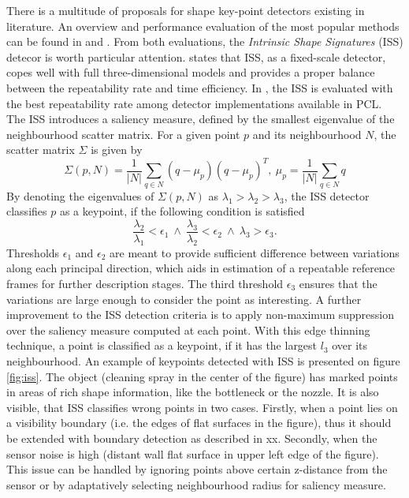 There is a multitude of proposals for shape key-point detectors existing in literature. An overview and performance evaluation of the most popular methods can be found in \cite{keypoints1} and \cite{keypoints2}. From both evaluations, the \textit{Intrinsic Shape Signatures} (ISS) \cite{ISS} detecor is worth particular attention. \cite{keypoints1} states that ISS, as a fixed-scale detector, copes well with full three-dimensional models and provides a proper balance between the repeatability rate and time efficiency. In \cite{keypoints2}, the ISS is evaluated with the best repeatability rate among detector implementations available in PCL. The ISS introduces a saliency measure, defined by the smallest eigenvalue of the neighbourhood scatter matrix. For a given point $p$ and its neighbourhood $N$, the scatter matrix $\Sigma$ is given by
\begin{equation}
\label{eq:scatter}
\Sigma(p,N) = \frac{1}{|N|} \sum\limits_{q\in N}(q -\mu_p)(q - \mu_p)^T,\ \mu_p = \frac{1}{|N|}\sum\limits_{q\in N}q
\end{equation}
By denoting the eigenvalues of $\Sigma(p, N)$ as $\lambda_1 > \lambda_2 > \lambda_3$, the ISS detector classifies $p$ as a keypoint, if the following condition is satisfied
\begin{equation}
\label{iss}
\frac{\lambda_2}{\lambda_1} < \epsilon_1 \  \land \  \frac{\lambda_3}{\lambda_2} < \epsilon_2 \ \land \  \lambda_3 > \epsilon_3.
\end{equation} 
Thresholds $\epsilon_1$ and $\epsilon_2$ are meant to provide sufficient difference between variations along each principal direction, which aids in estimation of a repeatable reference frames for further description stages. The third threshold $\epsilon_3$ ensures that the variations are large enough to consider the point as interesting. A further improvement to the ISS detection criteria is to apply non-maximum suppression over the saliency measure computed at each point. With this edge thinning technique, a point is classified as a keypoint, if it has the largest $l_3$ over its neighbourhood.  An example of keypoints detected with ISS is presented on figure \ref{fig:iss}. The object (cleaning spray in the center of the figure) has marked points in areas of rich shape information, like the bottleneck or the nozzle. It is also visible, that ISS classifies wrong points in two cases. Firstly, when a point lies on a visibility boundary (i.e. the edges of flat surfaces in the figure), thus it should be extended with boundary detection as described in xx. Secondly, when the sensor noise is high (distant wall flat surface in upper left edge of the figure). This issue can be handled by ignoring points above certain z-distance from the sensor or by adaptatively selecting neighbourhood radius for saliency measure.

